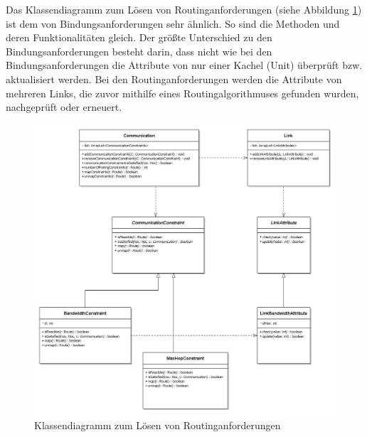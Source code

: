 Das Klassendiagramm zum Lösen von Routinganforderungen (siehe Abbildung \ref{fig:klRoute}) ist dem von Bindungsanforderungen sehr ähnlich. So sind die Methoden und deren Funktionalitäten gleich. Der größte Unterschied zu den Bindungsanforderungen besteht darin, dass nicht wie bei den Bindungsanforderungen die Attribute von nur einer Kachel (Unit) überprüft bzw. aktualisiert werden. Bei den Routinganforderungen werden die Attribute von mehreren Links, die zuvor mithilfe eines Routingalgorithmuses gefunden wurden, nachgeprüft oder erneuert.
\begin{figure}[H]\centering
  \includegraphics[width = 150mm]{bilder/communication-link.jpg}
  \caption{Klassendiagramm zum Lösen von Routinganforderungen}\label{fig:klRoute}
\end{figure}